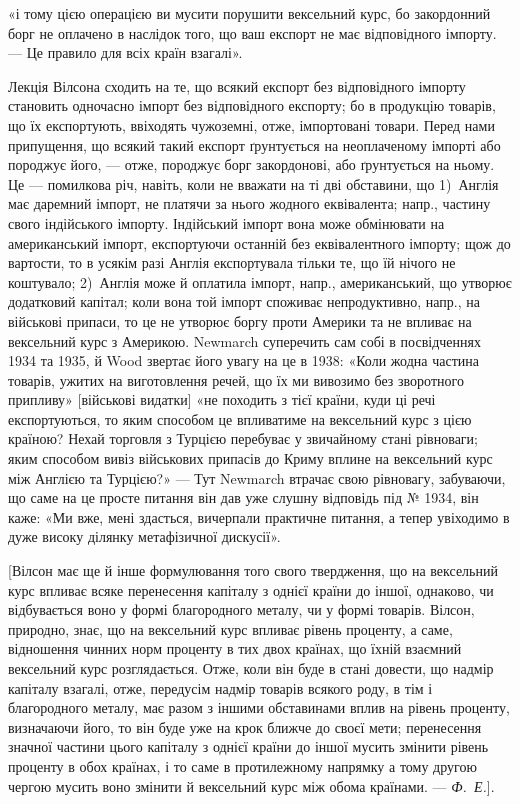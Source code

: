 \parcont{}  %
«і тому цією операцією ви мусити порушити вексельний курс, бо закордонний
борг не оплачено в наслідок того, що ваш експорт не має відповідного імпорту.
— Це правило для всіх країн взагалі».

Лекція Вілсона сходить на те, що всякий експорт без відповідного імпорту
становить одночасно імпорт без відповідного експорту; бо в продукцію товарів,
що їх експортують, ввіходять чужоземні, отже, імпортовані товари. Перед
нами припущення, що всякий такий експорт ґрунтується на неоплаченому
імпорті або породжує його, — отже, породжує борг закордонові, або ґрунтується
на ньому. Це — помилкова річ, навіть, коли не вважати на ті дві обставини,
що 1)~Англія має даремний імпорт, не платячи за нього жодного еквівалента;
напр., частину свого індійського імпорту. Індійський імпорт вона може обмінювати
на американський імпорт, експортуючи останній без еквівалентного імпорту;
щож до вартости, то в усякім разі Англія експортувала тільки те, що їй нічого
не коштувало; 2)~Англія може й оплатила імпорт, напр., американський, що
утворює додатковий капітал; коли вона той імпорт споживає непродуктивно,
напр., на військові припаси, то це не утворює боргу проти Америки та не
впливає на вексельний курс з Америкою. Newmarch суперечить сам собі в
посвідченнях 1934 та 1935, й Wood звертає його увагу на це в 1938: «Коли
жодна частина товарів, ужитих на виготовлення речей, що їх ми вивозимо без
зворотного припливу» [військові видатки] «не походить з тієї країни, куди ці
речі експортуються, то яким способом це впливатиме на вексельний курс з цією
країною? Нехай торговля з Турцією перебуває у звичайному стані рівноваги;
яким способом вивіз військових припасів до Криму вплине на вексельний курс
між Англією та Турцією?» — Тут Newmarch втрачає свою рівновагу, забуваючи,
що саме на це просте питання він дав уже слушну відповідь під № 1934, він
каже: «Ми вже, мені здасться, вичерпали практичне питання, а тепер увіходимо
в дуже високу ділянку метафізичної дискусії».

[Вілсон має ще й інше формулювання того свого твердження, що на вексельний
курс впливає всяке перенесення капіталу з однієї країни до іншої, однаково,
чи відбувається воно у формі благородного металу, чи у формі товарів.
Вілсон, природно, знає, що на вексельний курс впливає рівень проценту, а
саме, відношення чинних норм проценту в тих двох країнах, що їхній взаємний
вексельний курс розглядається. Отже, коли він буде в стані довести, що надмір
капіталу взагалі, отже, передусім надмір товарів всякого роду, в тім і благородного
металу, має разом з іншими обставинами вплив на рівень проценту, визначаючи
його, то він буде уже на крок ближче до своєї мети; перенесення
значної частини цього капіталу з однієї країни до іншої мусить змінити рівень
проценту в обох країнах, і то саме в протилежному напрямку а тому другою
чергою мусить воно змінити й вексельний курс між обома країнами. — \emph{Ф.~Е.}].


